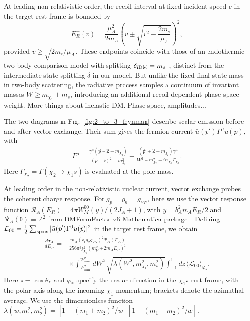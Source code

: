 \documentclass[prd,showpacs,preprintnumbers,amsmath,amssymb,twocolumn,
superscriptaddress,notitlepage]{revtex4-2}
\newcommand{\zb}[1]{{\color{blue} {#1}}}
\begin{document}
At leading non-relativistic order, the recoil interval
at fixed incident speed $v$ in the target rest frame
is bounded by
\begin{equation}
E_R^{\pm}(v)=\frac{\mu_A^2}{2m_A}
\left(v\pm\sqrt{v^2-\frac{2m_s}{\mu_A}}\right)^2,
\label{eq:radiative-recoil-endpoints}
\end{equation}
provided $v\geq\sqrt{2m_s/\mu_A}$.
These endpoints coincide with those of an endothermic
two-body comparison model with splitting
$\delta_{\rm iDM}=m_s$~\cite{Bramante:2016rdh},
distinct from the intermediate-state splitting $\delta$
in our model.
But unlike the fixed final-state mass in two-body scattering,
the radiative process samples a continuum of invariant
masses $W\geq m_{\chi_1}+m_s$, introducing an additional
recoil-dependent phase-space weight. \zb{More things about inelastic DM. Phase space, amplitudes...}

The two diagrams in Fig.~\ref{fig:2_to_3_feynman} describe scalar
emission before and after vector exchange. Their sum gives the
fermion current $\bar u(p')\Gamma^\mu u(p)$, with
\begin{equation}
\begin{split}
\Gamma^\mu=
\frac{\gamma^\mu(\not p-\not k+m_{\chi_2})}
{(p-k)^2-m_{\chi_2}^2}
+
\frac{(\not p'+\not k+m_{\chi_2})\gamma^\mu}
{W^2-m_{\chi_2}^2+i m_{\chi_2}\Gamma_{\chi_2}}.
\end{split}
\label{eq:radiative-current}
\end{equation}
Here $\Gamma_{\chi_2}=\Gamma(\chi_2\to\chi_1s)$ is evaluated
at the pole mass. 

At leading order in the non-relativistic nuclear current, vector
exchange probes the coherent charge response. For
$g_p=g_n=g_{VN}$, here we use the vector response function
$\mathcal R_A(E_R)=4\pi W_M^{00}(y)/(2J_A+1)$, with
$y=b_A^2m_AE_R/2$ and
$\mathcal R_A(0)=A^2$ from DMFormFactor-v6 Mathematica package~\cite{Fitzpatrick:2012ix, Anand:2013yka}.
Defining
$\mathcal L_{00}=\tfrac12\sum_{\rm spins}
|\bar u(p')\Gamma^0u(p)|^2$
in the target rest frame, we obtain
\begin{equation}
\begin{split}
\frac{d\sigma_A}{dE_R}
={}&
\frac{m_A(g_1g_2g_{VN})^2\mathcal R_A(E_R)}
{256\pi^3p_{\chi_1}^2(m_V^2+2m_AE_R)^2}
\\
&\times
\int_{W_{\min}^2}^{W_{\max}^2}dW^2\,
\sqrt{\lambda(W^2,m_{\chi_1}^2,m_s^2)}
\int_{-1}^{1}dz\,
\langle\mathcal L_{00}\rangle_{\varphi_*}.
\end{split}
\label{eq:radiative-recoil}
\end{equation}
Here $z=\cos\theta_*$ and $\varphi_*$ specify the scalar direction
in the $\chi_1s$ rest frame, with the polar axis along the incoming
$\chi_1$ momentum; brackets denote the azimuthal average.
We use the dimensionless function
$\lambda(w,m_1^2,m_2^2)=
[1-(m_1+m_2)^2/w][1-(m_1-m_2)^2/w]$.
\end{document}
